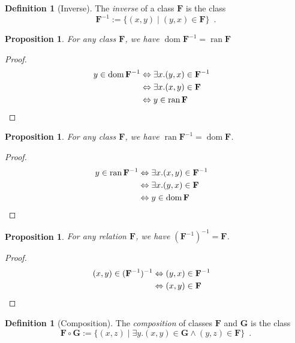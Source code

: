 \documentclass{book}
\let\qed\relax
\newtheorem{prop}[ax]{Proposition}
\theoremstyle{definition}
\newtheorem{df}[ax]{Definition}
\newcommand{\dom}{\ensuremath{\operatorname{dom}}}
\newcommand{\ran}{\ensuremath{\operatorname{ran}}}
\begin{document}
\begin{df}[Inverse]
The \emph{inverse} of a class $\mathbf{F}$ is the class
\[ \mathbf{F}^{-1} := \{ (x,y) \mid (y,x) \in \mathbf{F} \} \enspace . \]
\end{df}

\begin{prop}
\label{prop:dominv}
For any class $\mathbf{F}$, we have $\dom \mathbf{F}^{-1} = \ran \mathbf{F}$
\end{prop}

\begin{proof}
\pf
\begin{align*}
y \in \dom \mathbf{F}^{-1} & \Leftrightarrow \exists x. (y,x) \in \mathbf{F}^{-1} \\
& \Leftrightarrow \exists x. (x,y) \in \mathbf{F} \\
& \Leftrightarrow y \in \ran \mathbf{F} & \qed
\end{align*}
\end{proof}

\begin{prop}
For any class $\mathbf{F}$, we have $\ran \mathbf{F}^{-1} = \dom \mathbf{F}$.
\end{prop}

\begin{proof}
\pf
\begin{align*}
y \in \ran \mathbf{F}^{-1} & \Leftrightarrow \exists x. (x,y) \in \mathbf{F}^{-1} \\
& \Leftrightarrow \exists x. (y,x) \in \mathbf{F} \\
& \Leftrightarrow y \in \dom \mathbf{F} & \qed
\end{align*}
\end{proof}

\begin{prop}
For any relation $\mathbf{F}$, we have $(\mathbf{F}^{-1})^{-1} = \mathbf{F}$.
\end{prop}

\begin{proof}
\pf
\begin{align*}
(x,y) \in (\mathbf{F}^{-1})^{-1} & \Leftrightarrow (y,x) \in \mathbf{F}^{-1} \\
& \Leftrightarrow (x,y) \in \mathbf{F} & \qed
\end{align*}
\end{proof}

\begin{df}[Composition]
The \emph{composition} of classes $\mathbf{F}$ and $\mathbf{G}$ is the class
\[ \mathbf{F} \circ \mathbf{G} := \{ (x,z) \mid \exists y. (x,y) \in \mathbf{G} \wedge (y,z) \in \mathbf{F} \} \enspace . \]
\end{df}
\end{document}
